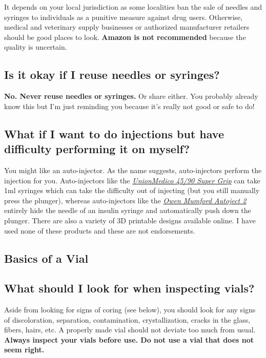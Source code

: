 \documentclass{article}
\begin{document}
{{It depends on your local jurisdiction as some localities ban the sale of needles and syringes to individuals as a punitive measure against drug users. Otherwise, medical and veterinary supply businesses or authorized manufacturer retailers should be good places to look. \textbf{Amazon is not recommended} because the quality is uncertain.

\subsection{Is it okay if I reuse needles or syringes?}

\textbf{No. Never reuse needles or syringes. }Or share either. You probably already know this but I’m just reminding you because it’s really not good or safe to do!

\subsection{What if I want to do injections but have difficulty performing it on myself?}\label{5-21}

You might like an auto-injector. As the name suggests, auto-injectors perform the injection for you. Auto-injectors like the \href{https://unionmedico.com/90-super-grip/}{\textit{UnionMedico 45/90 Super Grip}} can take 1ml syringes which can take the difficulty out of injecting (but you still manually press the plunger), whereas auto-injectors like the \href{https://www.owenmumford.com/us/medical-devices/autoject-2}{\textit{Owen Mumford Autoject 2}} entirely hide the needle of an insulin syringe and automatically push down the plunger. There are also a variety of 3D printable designs available online. I have used none of these products and these are not endorsements.

\subsection*{Basics of a Vial}

\subsection{What should I look for when inspecting vials?}

Aside from looking for signs of coring (see below), you should look for any signs of discoloration, separation, contamination, crystallization, cracks in the glass, fibers, hairs, etc. A properly made vial should not deviate too much from usual. \textbf{Always inspect your vials before use. Do not use a vial that does not seem right.}

}}
\end{document}
